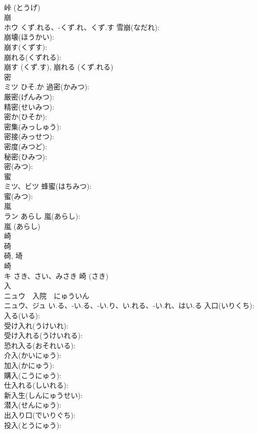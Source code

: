 \documentclass[8pt]{extreport}
\begin{document}
\begin{CJK}{UTF8}{min}
\\	峠 (とうげ)
\\	崩			
\\	ホウ	くず.れる、-くず.れ、くず.す	雪崩(なだれ): 
\\	崩壊(ほうかい): 
\\	崩す(くずす): 
\\	崩れる(くずれる): 
\\	崩す (くず.す), 崩れる (くず.れる)
\\	密			
\\	ミツ	ひそ.か	過密(かみつ): 
\\	厳密(げんみつ): 
\\	精密(せいみつ): 
\\	密か(ひそか): 
\\	密集(みっしゅう): 
\\	密接(みっせつ): 
\\	密度(みつど): 
\\	秘密(ひみつ): 
\\	密(みつ): 
\\	蜜			
\\	ミツ、ビツ		蜂蜜(はちみつ): 
\\	蜜(みつ): 
\\	嵐			
\\	ラン	あらし	嵐(あらし): 
\\	嵐 (あらし)
\\	崎			
\\	碕 
\\	碕, 埼 
\\	崎 
\\	キ	さき、さい、みさき		崎 (さき)
\\	入			
\\	ニュウ　入院　にゅういん
\\	ニュウ、ジュ	い.る、-い.る、-い.り、い.れる、-い.れ、はい.る	入口(いりくち): 
\\	入る(いる): 
\\	受け入れ(うけいれ): 
\\	受け入れる(うけいれる): 
\\	恐れ入る(おそれいる): 
\\	介入(かいにゅう): 
\\	加入(かにゅう): 
\\	購入(こうにゅう): 
\\	仕入れる(しいれる): 
\\	新入生(しんにゅうせい): 
\\	潜入(せんにゅう): 
\\	出入り口(でいりぐち): 
\\	投入(とうにゅう): 

\end{CJK}
\end{document}

